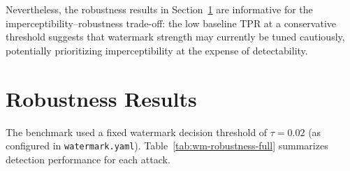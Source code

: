 Nevertheless, the robustness results in Section~\ref{sec:wm-robustness-results}
are informative for the imperceptibility--robustness trade-off: the low baseline
TPR at a conservative threshold suggests that watermark strength may currently be
tuned cautiously, potentially prioritizing imperceptibility at the expense of
detectability.

\section{Robustness Results}
\label{sec:wm-robustness-results}

The benchmark used a fixed watermark decision threshold of $\tau=0.02$ (as
configured in \texttt{watermark.yaml}). Table~\ref{tab:wm-robustness-full}
summarizes detection performance for each attack.

